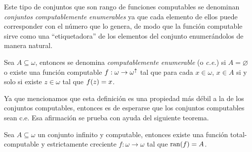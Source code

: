 Este tipo de conjuntos que son rango de funciones computables se denominan \emph{conjuntos computablemente enumerables} ya que cada elemento de ellos puede corresponder con el número que lo genera, de modo que la función computable sirve como una ``etiquetadora'' de los elementos del conjunto enumerándolos de manera natural.

\begin{definition}
	Sea $A\subseteq\omega$, entonces se denomina \emph{computablemente enumerable} (o \emph{c.e.}) si $A =\varnothing$ o existe una función computable $f:\omega\to\omega^{\uparrow}$ tal que para cada $x\in\omega$, $x\in A$ si y solo si existe $z\in\omega$ tal que $f\pa*{z}= x$.
\end{definition}

Ya que mencionamos que esta definición es una propiedad más débil a la de los conjuntos computables, entonces es de esperarse que los conjuntos computables sean c.e. Esa afirmación se prueba con ayuda del siguiente teorema.

\begin{theorem}
	\label{theo: infinito_computable_creciente} %
	Sea $A\subseteq\omega$ un conjunto infinito y computable, entonces existe una función total-computable y estrictamente creciente $f:\omega\to\omega$ tal que $\RANGO{f} = A$.
\end{theorem}

